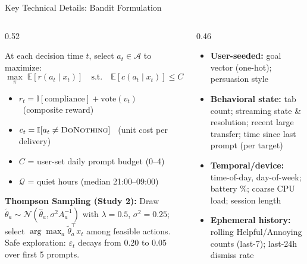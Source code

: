 \documentclass[10pt,aspectratio=169]{beamer}
\begin{document}

\begin{frame}{Key Technical Details: Bandit Formulation}
\vspace{0pt}
\begin{columns}[T]
\begin{column}{0.52\textwidth}
\begin{keybox}
\small
At each decision time $t$, select $a_t \in \mathcal{A}$ to maximize:
\[
\max_{\pi}\;\mathbb{E}[r(a_t \mid x_t)] \quad\text{s.t.}\quad \mathbb{E}[c(a_t \mid x_t)] \le C,\; a_t \notin \mathcal{Q}
\]

\scriptsize
\begin{itemize}\setlength\itemsep{1pt}
  \item $r_t = \mathbb{I}[\text{compliance}] + \text{vote}(v_t)$ ~(composite reward)
  \item $c_t = \mathbb{I}[a_t \neq \textsc{DoNothing}]$ ~(unit cost per delivery)
  \item $C$ = user-set daily prompt budget (0--4)
  \item $\mathcal{Q}$ = quiet hours (median 21:00--09:00)
\end{itemize}
\end{keybox}
\vspace{3pt}
\begin{findingbox}
\scriptsize
\textbf{Thompson Sampling (Study 2):} Draw $\tilde{\theta}_a \sim \mathcal{N}(\hat{\theta}_a, \sigma^2 A_a^{-1})$ with $\lambda{=}0.5$, $\sigma^2{=}0.25$; select $\arg\max_a \tilde{\theta}_a^\top x_t$ among feasible actions. Safe exploration: $\varepsilon_t$ decays from 0.20 to 0.05 over first 5 prompts.
\end{findingbox}
\end{column}
\begin{column}{0.46\textwidth}
\begin{keybox}
\scriptsize
\begin{itemize}\setlength\itemsep{0pt}
  \item \textbf{User-seeded:} goal vector (one-hot); persuasion style
  \item \textbf{Behavioral state:} tab count; streaming state \& resolution; recent large transfer; time since last prompt (per target)
  \item \textbf{Temporal/device:} time-of-day, day-of-week; battery \%; coarse CPU load; session length
  \item \textbf{Ephemeral history:} rolling Helpful/Annoying counts (last-7); last-24h dismiss rate

\end{itemize}
\end{keybox}
\end{column}
\end{columns}
\end{frame}
\end{document}
